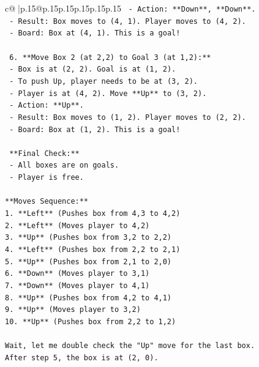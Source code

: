 \documentclass{article}
\begin{document}
{\begin{supertabular}{c@{$\;$}|p{.15\linewidth}@{}p{.15\linewidth}p{.15\linewidth}p{.15\linewidth}p{.15\linewidth}p{.15\linewidth}}
{{{\texttt{        {-} Action: **Down**, **Down**.} \\
\texttt{        {-} Result: Box moves to (4, 1). Player moves to (4, 2).} \\
\texttt{        {-} Board: Box at (4, 1). This is a goal!} \\
\\ 
\texttt{    6.  **Move Box 2 (at 2,2) to Goal 3 (at 1,2):**} \\
\texttt{        {-} Box is at (2, 2). Goal is at (1, 2).} \\
\texttt{        {-} To push Up, player needs to be at (3, 2).} \\
\texttt{        {-} Player is at (4, 2). Move **Up** to (3, 2).} \\
\texttt{        {-} Action: **Up**.} \\
\texttt{        {-} Result: Box moves to (1, 2). Player moves to (2, 2).} \\
\texttt{        {-} Board: Box at (1, 2). This is a goal!} \\
\\ 
\texttt{    **Final Check:**} \\
\texttt{    {-} All boxes are on goals.} \\
\texttt{    {-} Player is free.} \\
\\ 
\texttt{**Moves Sequence:**} \\
\texttt{1.  **Left** (Pushes box from 4,3 to 4,2)} \\
\texttt{2.  **Left** (Moves player to 4,2)} \\
\texttt{3.  **Up** (Pushes box from 3,2 to 2,2)} \\
\texttt{4.  **Left** (Pushes box from 2,2 to 2,1)} \\
\texttt{5.  **Up** (Pushes box from 2,1 to 2,0)} \\
\texttt{6.  **Down** (Moves player to 3,1)} \\
\texttt{7.  **Down** (Moves player to 4,1)} \\
\texttt{8.  **Up** (Pushes box from 4,2 to 4,1)} \\
\texttt{9.  **Up** (Moves player to 3,2)} \\
\texttt{10. **Up** (Pushes box from 2,2 to 1,2)} \\
\\ 
\texttt{Wait, let me double check the "Up" move for the last box.} \\
\texttt{After step 5, the box is at (2, 0).} \\
}}}
\end{supertabular}}
\end{document}
